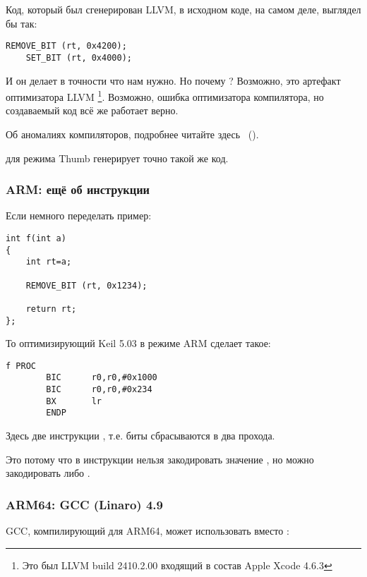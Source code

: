 Код, который был сгенерирован LLVM, в исходном коде, на самом деле, выглядел бы так:

\begin{lstlisting}[style=customc]
    REMOVE_BIT (rt, 0x4200);
    SET_BIT (rt, 0x4000);
\end{lstlisting}

И он делает в точности что нам нужно. 
Но почему ? 
Возможно, это артефакт оптимизатора LLVM
\footnote{Это был LLVM build 2410.2.00 входящий в состав Apple Xcode 4.6.3}.
Возможно, ошибка оптимизатора компилятора, но создаваемый код всё же работает верно.

Об аномалиях компиляторов, подробнее читайте здесь ~().

\OptimizingXcodeIV для режима Thumb генерирует точно такой же код.

\subsubsection{ARM: ещё об инструкции }

Если немного переделать пример:

\begin{lstlisting}[style=customc]
int f(int a)
{
    int rt=a;

    REMOVE_BIT (rt, 0x1234);

    return rt;
};
\end{lstlisting}

То оптимизирующий Keil 5.03 в режиме ARM сделает такое:

\begin{lstlisting}[style=customasmARM]
f PROC
        BIC      r0,r0,#0x1000
        BIC      r0,r0,#0x234
        BX       lr
        ENDP
\end{lstlisting}

Здесь две инструкции , т.е. биты  сбрасываются в два прохода.

Это потому что в инструкции  нельзя закодировать значение , 
но можно закодировать  либо .

\subsubsection{ARM64: \Optimizing GCC (Linaro) 4.9}

\Optimizing GCC, компилирующий для ARM64, может использовать \AND вместо :

